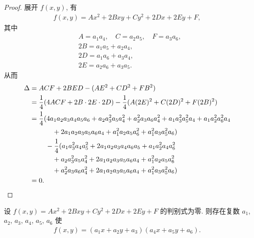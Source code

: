\begin{proof}
    展开 \(f(x, y)\), 有
    \begin{align*}
        f(x,y) = A x^2 + 2B xy + C y^2 + 2D x + 2E y + F,
    \end{align*}
    其中
    \begin{align*}
         & A = a_1 a_4, \quad C = a_2 a_5, \quad F = a_3 a_6, \\
         & 2B = a_1 a_5 + a_2 a_4,                            \\
         & 2D = a_1 a_6 + a_3 a_4,                            \\
         & 2E = a_2 a_6 + a_3 a_5.
    \end{align*}
    从而
    \begin{align*}
        \Delta
        = {} & ACF + 2BED - (AE^2 + CD^2 + FB^2)                                                                                        \\
        = {} & \frac{1}{4} (4ACF + 2B \cdot 2E \cdot 2D) - \frac{1}{4} (A (2E)^2 + C (2D)^2 + F(2B)^2)                                  \\
        = {} & \frac{1}{4} (4 a_1 a_2 a_3 a_4 a_5 a_6 + a_2 a_3^2 a_5 a_4^2+a_2^2 a_3 a_6 a_4^2+a_1 a_3^2 a_5^2 a_4+a_1 a_2^2 a_6^2 a_4 \\
             & \quad \quad +2 a_1 a_2 a_3 a_5 a_6 a_4+a_1^2 a_2 a_5 a_6^2+a_1^2 a_3 a_5^2 a_6)                                          \\
             & \quad - \frac{1}{4} (a_1 a_3^2 a_4 a_5^2+2 a_1 a_2 a_3 a_4 a_6 a_5+a_1 a_2^2 a_4 a_6^2                                   \\
             & \quad \quad +a_2 a_3^2 a_5 a_4^2+2 a_1 a_2 a_3 a_5 a_6 a_4+a_1^2 a_2 a_5 a_6^2                                           \\
             & \quad \quad +a_2^2 a_3 a_6 a_4^2+2 a_1 a_2 a_3 a_5 a_6 a_4+a_1^2 a_3 a_5^2 a_6)                                          \\
        = {} & 0.
        \qedhere
    \end{align*}
\end{proof}

\begin{theorem}
    设 \(f(x, y) = Ax^2 + 2Bxy + Cy^2 + 2Dx + 2Ey + F\)
    的判别式为零.
    则存在复数
    \(a_1\), \(a_2\), \(a_3\), \(a_4\), \(a_5\), \(a_6\)
    使
    \begin{align*}
        f(x, y) = (a_1 x + a_2 y + a_3) (a_4 x + a_5 y + a_6).
    \end{align*}
\end{theorem}

